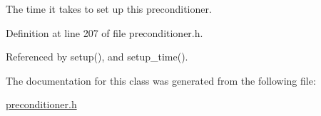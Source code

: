 The time it takes to set up this preconditioner. 



Definition at line 207 of file preconditioner.\+h.



Referenced by setup(), and setup\+\_\+time().



The documentation for this class was generated from the following file\+:\begin{DoxyCompactItemize}
\item 
\hyperlink{preconditioner_8h}{preconditioner.\+h}\end{DoxyCompactItemize}
